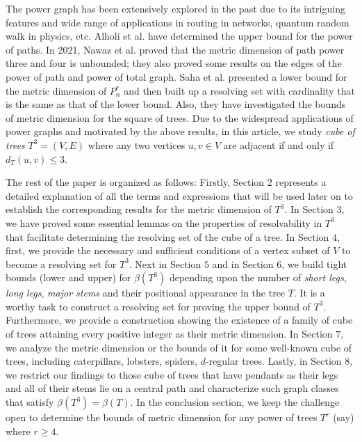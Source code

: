 \documentclass{article}
\theoremstyle{definition}
\numberwithin{equation}{section}
\begin{document}
\vspace{0.5em}
The power graph has been extensively explored in the past due to its intriguing features and wide range of applications in routing in networks, quantum random walk in physics, etc. Alholi et al. \cite{AAE} have determined the upper bound for the power of paths. In 2021, Nawaz et al. \cite{NAKK} proved that the metric dimension of path power three and four is unbounded; they also proved some results on the edges of the power of path and power of total graph. Saha et al. \cite{Saha} presented a lower bound for the metric dimension of $P_{n}^{r}$ and then built up a resolving set with cardinality that is the same as that of the lower bound. Also, they have investigated the bounds of metric dimension for the square of trees. Due to the widespread applications of power graphs and motivated by the above results, in this article, we study {\em cube of trees} $T^{3}=(V, E)$ where any two vertices $u,v\in V$ are adjacent if and only if $d_{T}(u,v)\leq 3$. 



\vspace{0.5em}
The rest of the paper is organized as follows: Firstly, Section $2$ represents a detailed explanation of all the terms and expressions that will be used later on to establish the corresponding results for the metric dimension of $T^{3}$. In Section $3$, we have proved some essential lemmas on the properties of resolvability in $T^{3}$ that facilitate determining the resolving set of the cube of a tree. In Section $4$, first, we provide the necessary and sufficient conditions of a vertex subset of $V$ to become a resolving set for $T^{3}$. Next in Section $5$ and in Section $6$, we build tight bounds (lower and upper) for $\beta{(T^{3})}$ depending upon the number of {\em short legs}, {\em long legs}, {\em major stems} and their positional appearance in the tree $T$. It is a worthy task to construct a resolving set for proving the upper bound of $T^{3}$.
Furthermore, we provide a construction showing the existence of a family of cube of trees attaining every positive integer as their metric dimension. In Section $7$, we analyze the metric dimension or the bounds of it for some well-known cube of trees, including caterpillars, lobsters, spiders, $d$-regular trees. Lastly, in Section $8$, we restrict our findings to those cube of trees that have pendants as their legs and all of their stems lie on a central path and characterize such graph classes that satisfy $\beta{(T^{3})=\beta{(T)}}$.  In the conclusion section, we keep the challenge open to determine the bounds of metric dimension for any power of trees $T^{r}$ (say) where $r\geq 4$.
\end{document}

